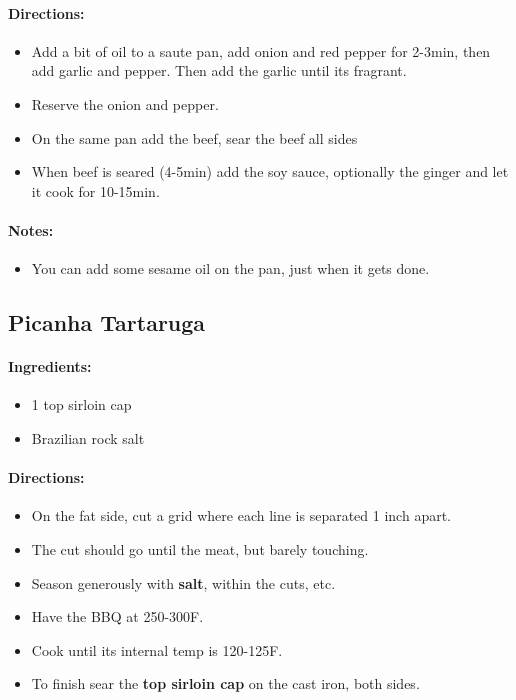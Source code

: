 \documentclass{article}
\begin{document}
\paragraph{Directions:}
\begin{itemize}
    \item Add a bit of oil to a saute pan, add onion and red pepper for 2-3min, then add garlic and pepper. Then add the garlic until its fragrant.
    \item Reserve the onion and pepper.
    \item On the same pan add the beef, sear the beef all sides
    \item When beef is seared (4-5min) add the soy sauce, optionally the ginger and let it cook for 10-15min.
\end{itemize}

\paragraph{Notes:}
\begin{itemize}
    \item You can add some sesame oil on the pan, just when it gets done.
\end{itemize}

\subsection{Picanha Tartaruga}

\paragraph{Ingredients:}
\begin{itemize}
    \item 1 top sirloin cap
    \item Brazilian rock salt
\end{itemize}

\paragraph{Directions:}
\begin{itemize}
    \item On the fat side, cut a grid where each line is separated 1 inch apart.
    \item The cut should go until the meat, but barely touching.
    \item Season generously with \textbf{salt}, within the cuts, etc.
    \item Have the BBQ at 250-300F.
    \item Cook until its internal temp is 120-125F.
    \item To finish sear the \textbf{top sirloin cap} on the cast iron, both sides.
\end{itemize}
\end{document}
